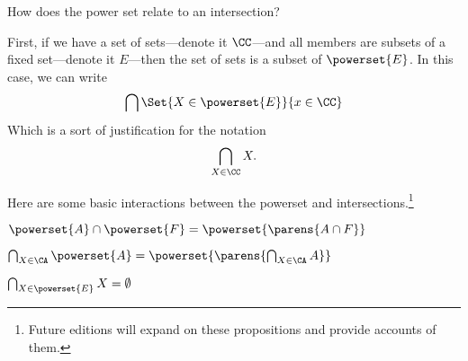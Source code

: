

How does the power set relate to an intersection?


First, if we have a set of sets---denote it $\CC$---and all members are subsets of a fixed set---denote it $E$---then the set of sets is a subset of $\powerset{E}$.
In this case, we can write
\[
  \bigcap \Set{X \in \powerset{E}}{x \in \CC}
\]
Which is a sort of justification for the notation
\[
  \bigcap_{X \in \CC} X.
\]


Here are some basic interactions between the powerset and intersections.\footnote{Future editions will expand on these propositions and provide accounts of them.}

\begin{proposition}
  $\powerset{A} \cap \powerset{F} = \powerset{\parens{A \cap F}}$
\end{proposition}

\begin{proposition}
  $\bigcap_{X \in \CA} \powerset{A} = \powerset{\parens{\bigcap_{X \in \CA} A}}$
\end{proposition}

\begin{proposition}
  $\bigcap_{X \in \powerset{E}} X = \emptyset$
\end{proposition}


\blankpage
